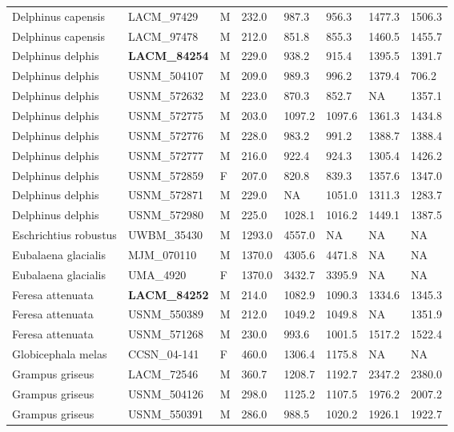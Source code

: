 \begin{longtable}{|p{1.95in}p{1.1in}p{.15in}p{.4in}p{.4in}p{.4in}p{.4in}p{.4in}|}
  Delphinus capensis & LACM\_97429 & M & 232.0 & 987.3 & 956.3 & 1477.3 & 1506.3 \\ 
  Delphinus capensis & LACM\_97478 & M & 212.0 & 851.8 & 855.3 & 1460.5 & 1455.7 \\ 
  Delphinus delphis & \textbf{ LACM\_84254 } & M & 229.0 & 938.2 & 915.4 & 1395.5 & 1391.7 \\ 
  Delphinus delphis & USNM\_504107 & M & 209.0 & 989.3 & 996.2 & 1379.4 & 706.2 \\ 
  Delphinus delphis & USNM\_572632 & M & 223.0 & 870.3 & 852.7 & NA & 1357.1 \\ 
  Delphinus delphis & USNM\_572775 & M & 203.0 & 1097.2 & 1097.6 & 1361.3 & 1434.8 \\ 
  Delphinus delphis & USNM\_572776 & M & 228.0 & 983.2 & 991.2 & 1388.7 & 1388.4 \\ 
  Delphinus delphis & USNM\_572777 & M & 216.0 & 922.4 & 924.3 & 1305.4 & 1426.2 \\ 
  Delphinus delphis & USNM\_572859 & F & 207.0 & 820.8 & 839.3 & 1357.6 & 1347.0 \\ 
  Delphinus delphis & USNM\_572871 & M & 229.0 & NA & 1051.0 & 1311.3 & 1283.7 \\ 
  Delphinus delphis & USNM\_572980 & M & 225.0 & 1028.1 & 1016.2 & 1449.1 & 1387.5 \\ 
  Eschrichtius robustus & UWBM\_35430 & M & 1293.0 & 4557.0 & NA & NA & NA  \\ 
  Eubalaena glacialis & MJM\_070110 & M & 1370.0 & 4305.6 & 4471.8 & NA & NA  \\ 
  Eubalaena glacialis & UMA\_4920 & F & 1370.0 & 3432.7 & 3395.9 & NA & NA  \\ 
  Feresa attenuata & \textbf{ LACM\_84252 } & M & 214.0 & 1082.9 & 1090.3 & 1334.6 & 1345.3 \\ 
  Feresa attenuata & USNM\_550389 & M & 212.0 & 1049.2 & 1049.8 & NA & 1351.9 \\ 
  Feresa attenuata & USNM\_571268 & M & 230.0 & 993.6 & 1001.5 & 1517.2 & 1522.4 \\ 
  Globicephala melas & CCSN\_04-141 & F & 460.0 & 1306.4 & 1175.8 & NA & NA  \\ 
  Grampus griseus & LACM\_72546 & M & 360.7 & 1208.7 & 1192.7 & 2347.2 & 2380.0 \\ 
  Grampus griseus & USNM\_504126 & M & 298.0 & 1125.2 & 1107.5 & 1976.2 & 2007.2 \\ 
  Grampus griseus & USNM\_550391 & M & 286.0 & 988.5 & 1020.2 & 1926.1 & 1922.7 \\ 

\end{longtable}

